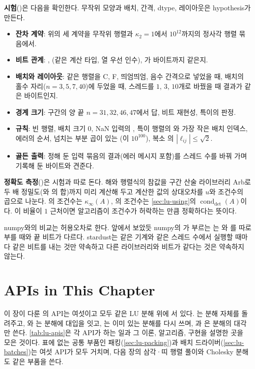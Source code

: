 \textbf{시험}()은 다음을 확인한다. 무작위 모양과 배치, 간격, dtype, 레이아웃은 hypothesis가 만든다.
\begin{itemize}
\item \textbf{잔차 계약}: 위의 세 계약을 무작위 행렬과 $\kappa_2=1$에서 $10^{12}$까지의 정사각 행렬 묶음에서.
\item \textbf{비트 관계}: , (같은 계산 타입, 열 우선 인수), 가 바이트까지 같은지.
\item \textbf{배치와 레이아웃}: 같은 행렬을 C, F, 띄엄띄엄, 음수 간격으로 넣었을 때, 배치의 홀수 자리($n=3,5,7,40$)에 두었을 때, 스레드를 $1$, $3$, $10$개로 바꿨을 때 결과가 같은 바이트인지.
\item \textbf{경계 크기}:  구간의 양 끝 $n=31,32,46,47$에서 답, 비트 재현성, 특이의 판정.
\item \textbf{규칙}: 빈 행렬, 배치 크기 $0$, NaN 입력의 , 특이 행렬의 와 가장 작은 배치 인덱스, 에러의 순서, 넘치는 부분 곱이 있는 (이 $10^{100}$), 복소 의 $|\ell_{ij}|\le\sqrt2$.
\item \textbf{골든 출력}: 정해 둔 입력 묶음의 결과(에러 메시지 포함)를 스레드 수를 바꿔 가며 기록해 둔 바이트와 견준다.
\end{itemize}

\textbf{정확도 측정}()은 시험과 따로 돈다. 해와 행렬식의 참값을 구간 산술 라이브러리 Arb로 두 배 정밀도(와 의 합)까지 미리 계산해 두고 계산한 값의 상대오차를 $u$와 조건수의 곱으로 나눈다. 의 조건수는 $\kappa_\infty(A)$, 의 조건수는 \cref{sec:lu-using}의 $\operatorname{cond}_{\det}(A)$이다. 이 비율이 $1$ 근처이면 알고리즘이 조건수가 허락하는 만큼 정확하다는 뜻이다.

numpy와의 비교는 허용오차로 한다. 앞에서 보았듯 numpy의 가 부르는 는 와 를 따로 부를 때와 끝 비트가 다르다. stardust는 같은 기계와 같은 스레드 수에서 실행할 때마다 같은 비트를 내는 것만 약속하고 다른 라이브러리와 비트가 같다는 것은 약속하지 않는다.

\section{APIs in This Chapter}
\label{sec:lu-apis}

이 장이 다룬 의 API는 여섯이고 모두 같은 LU 분해 위에 서 있다. 는 분해 자체를 돌려주고, 와 는 분해에 대입을 잇고, 는 이미 있는 분해를 다시 쓰며, 과 은 분해의 대각만 쓴다. \cref{tab:lu-apis}은 각 API가 하는 일과 그 이론, 알고리즘, 구현을 설명한 곳을 모은 것이다. 표에 없는 공통 부품인 패킹(\cref{sec:lu-packing})과 배치 드라이버(\cref{sec:lu-batches})는 여섯 API가 모두 거치며, 다음 장의 삼각·띠 행렬 풀이와 Cholesky 분해도 같은 부품을 쓴다.

